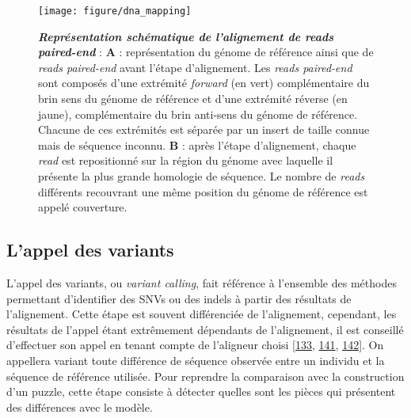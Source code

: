 \documentclass[12pt,a4paper,twoside]{ugathesis}
\theoremstyle{definition}
\theoremstyle{definition}
\theoremstyle{definition}
\theoremstyle{remark}
\begin{document}
\begin{figure}

{\centering \texttt{[image: figure/dna\_mapping]} 

}

\caption[Représentation schématique de l'alignement de reads paired-end]{\textbf{\emph{Représentation schématique de
l'alignement de reads paired-end}} : \textbf{A} : représentation du
génome de référence ainsi que de \emph{reads paired-end} avant l'étape
d'alignement. Les \emph{reads paired-end} sont composés d'une extrémité
\emph{forward} (en vert) complémentaire du brin sens du génome de
référence et d'une extrémité réverse (en jaune), complémentaire du brin
anti-sens du génome de référence. Chacune de ces extrémités est séparée
par un insert de taille connue mais de séquence inconnu. \textbf{B} :
après l'étape d'alignement, chaque \emph{read} est repositionné sur la
région du génome avec laquelle il présente la plus grande homologie de
séquence. Le nombre de \emph{reads} différents recouvrant une même
position du génome de référence est appelé couverture.}\label{fig:picdnamapping}
\end{figure}














\newpage

\hypertarget{varcall}{\subsection{L'appel des variants}\label{varcall}}

L'appel des variants, ou \emph{variant calling}, fait référence à
l'ensemble des méthodes permettant d'identifier des SNVs ou des indels à
partir des résultats de l'alignement. Cette étape est souvent
différenciée de l'alignement, cependant, les résultats de l'appel étant
extrêmement dépendants de l'alignement, il est conseillé d'effectuer son
appel en tenant compte de l'aligneur choisi
{[}\protect\hyperlink{ref-Nielsen2011}{133},
\protect\hyperlink{ref-DePristo2011}{141},
\protect\hyperlink{ref-Lunter2011}{142}{]}. On appellera variant toute
différence de séquence observée entre un individu et la séquence de
référence utilisée. Pour reprendre la comparaison avec la construction
d'un puzzle, cette étape consiste à détecter quelles sont les pièces qui
présentent des différences avec le modèle.
\end{document}
